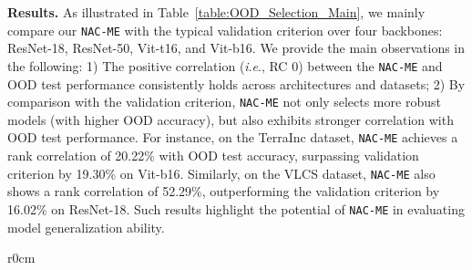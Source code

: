 \documentclass{article} \usepackage{iclr2024_conference,times}
\newcommand{\ie}{\textit{i}.\textit{e}.}
\newcommand{\bfstart}[1]{\noindent\textbf{#1.}}
\begin{document}
\bfstart{Results} As illustrated in Table~\ref{table:OOD_Selection_Main}, we mainly compare our \texttt{NAC-ME} with the typical validation criterion over four backbones: ResNet-18, ResNet-50, Vit-t16, and Vit-b16. 
We provide the main observations in the following:
1) The positive correlation (\ie, RC  0) between the \texttt{NAC-ME} and OOD test performance consistently holds across architectures and datasets; 
2) By comparison with the validation criterion, \texttt{NAC-ME} not only selects more robust models (with higher OOD accuracy), but also exhibits stronger correlation with OOD test performance. For instance, on the TerraInc dataset, \texttt{NAC-ME} achieves a rank correlation of 20.22\% with OOD test accuracy, surpassing validation criterion by 19.30\% on Vit-b16. 
Similarly, on the VLCS dataset, \texttt{NAC-ME} also shows a rank correlation of 52.29\%, outperforming the validation criterion by 16.02\% on ResNet-18. 
Such results highlight the potential of \texttt{NAC-ME} in evaluating model generalization ability.















\setlength\intextsep{0pt}
\begin{wraptable}[10]{r}{0cm}
	\caption{OOD generalization results on \texttt{PACS}~\citep{Dataset:PACS}, averaged over 3 trials. Backbone: ResNet-18.}
	\label{Tab:OOD_Selection_SoTA}
\end{wraptable}
\end{document}
